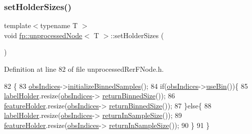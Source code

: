 \subsubsection{\texorpdfstring{set\+Holder\+Sizes()}{setHolderSizes()}\hspace{0.1cm}{\footnotesize\ttfamily [1/2]}}
{\footnotesize\ttfamily template$<$typename T $>$ \\
void \hyperlink{classfp_1_1unprocessedNode}{fp\+::unprocessed\+Node}$<$ T $>$\+::set\+Holder\+Sizes (\begin{DoxyParamCaption}{ }\end{DoxyParamCaption})\hspace{0.3cm}{\ttfamily [inline]}}



Definition at line 82 of file unprocessed\+Rer\+F\+Node.\+h.


\begin{DoxyCode}
82                                             \{
83                     \hyperlink{classfp_1_1unprocessedNode_aba9f03124658f62906fa8ded53cef535}{obsIndices}->\hyperlink{classfp_1_1stratifiedInNodeClassIndices_ae9907f8984615f91417fb7961e1b582d}{initializeBinnedSamples}();
84                     \textcolor{keywordflow}{if}(\hyperlink{classfp_1_1unprocessedNode_aba9f03124658f62906fa8ded53cef535}{obsIndices}->\hyperlink{classfp_1_1stratifiedInNodeClassIndices_af740a8054cefe977f8f1288fc6b39109}{useBin}())\{
85                         \hyperlink{classfp_1_1unprocessedNode_a2aa2f9dcba0b0a859457ed22e147f698}{labelHolder}.resize(\hyperlink{classfp_1_1unprocessedNode_aba9f03124658f62906fa8ded53cef535}{obsIndices}->
      \hyperlink{classfp_1_1stratifiedInNodeClassIndices_a9f77fe5e638170c4ad4ce99541561cfc}{returnBinnedSize}());
86                         \hyperlink{classfp_1_1unprocessedNode_ac2a435f6f38c5c0d2b4ba4b721fd5eaa}{featureHolder}.resize(\hyperlink{classfp_1_1unprocessedNode_aba9f03124658f62906fa8ded53cef535}{obsIndices}->
      \hyperlink{classfp_1_1stratifiedInNodeClassIndices_a9f77fe5e638170c4ad4ce99541561cfc}{returnBinnedSize}());
87                     \}\textcolor{keywordflow}{else}\{
88                         \hyperlink{classfp_1_1unprocessedNode_a2aa2f9dcba0b0a859457ed22e147f698}{labelHolder}.resize(\hyperlink{classfp_1_1unprocessedNode_aba9f03124658f62906fa8ded53cef535}{obsIndices}->
      \hyperlink{classfp_1_1stratifiedInNodeClassIndices_a596235ffec7250fabd2818d395b39c66}{returnInSampleSize}());
89                         \hyperlink{classfp_1_1unprocessedNode_ac2a435f6f38c5c0d2b4ba4b721fd5eaa}{featureHolder}.resize(\hyperlink{classfp_1_1unprocessedNode_aba9f03124658f62906fa8ded53cef535}{obsIndices}->
      \hyperlink{classfp_1_1stratifiedInNodeClassIndices_a596235ffec7250fabd2818d395b39c66}{returnInSampleSize}());
90                     \}
91                 \}
\end{DoxyCode}
\mbox{\label{classfp_1_1unprocessedNode_ae1aa4f8f868fe19c8e48d3fe1e5596a8}} 

